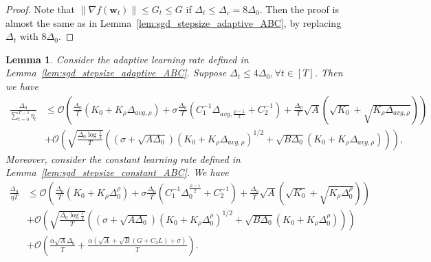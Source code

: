 \documentclass{article}
\newtheorem{lemma}{Lemma}
\newcommand{\Norm}[1]{\left\|#1\right\|}
\newcommand{\Kr}{K_{\rho}}
\newcommand{\paren}[1]{\left( #1 \right)}
\newcommand{\bw}{\mathbf{w}}
\begin{document}
\begin{proof}
    Note that $\Norm{\nabla f(\bw_t)}\leq G_t\leq G$ if $\Delta_t\leq\Delta_c=8\Delta_0$. Then the proof is almost the same as in Lemma~\ref{lem:sgd_stepsize_adaptive_ABC}, by replacing $\Delta_t$ with $8\Delta_0$.
\end{proof}

\begin{lemma}\label{lem:sgd_stepsize_complexity_ABC}
    Consider the adaptive learning rate defined in Lemma~\ref{lem:sgd_stepsize_adaptive_ABC}. 
    Suppose $\Delta_t\leq 4\Delta_0,\forall t\in[T]$.
    Then  we have 
    \begin{align*}
        \frac{\Delta_0}{\sum_{t=0}^{T-1}\eta_t}&\leq
        \mathcal{O}\paren{\frac{\Delta_0}{T}\paren{K_0+\Kr\Delta_{avg,\rho}}+\sigma\frac{\Delta_0}{T}\paren{C_1^{-1}\Delta_{avg,\frac{\rho-1}{2}}+C_2^{-1}}
        +\frac{\Delta_0}{T}\sqrt{A}\paren{\sqrt{K_0}+\sqrt{\Kr\Delta_{avg,\rho}}}}\\
        &+\mathcal{O}\paren{\sqrt{\frac{\Delta_0\log\frac{1}{\delta}}{T}}\paren{ \paren{\sigma+\sqrt{A\Delta_0}}\paren{K_0+\Kr\Delta_{avg,\rho}}^{1/2}+\sqrt{B\Delta_0}\paren{K_0+\Kr\Delta_{avg,\rho}}}},
    \end{align*}
    Moreover, consider the constant learning rate defined in Lemma~\ref{lem:sgd_stepsize_constant_ABC}. We have 
    \begin{align*}
        \frac{\Delta_0}{\eta T}&\leq
        \mathcal{O}\paren{\frac{\Delta_0}{T}\paren{K_0+\Kr\Delta_{0}^{\rho}}+\sigma\frac{\Delta_0}{T}\paren{C_1^{-1}\Delta_{0}^{\frac{\rho-1}{2}}+C_2^{-1}}
        +\frac{\Delta_0}{T}\sqrt{A}\paren{\sqrt{K_0}+\sqrt{\Kr\Delta_{0}^{\rho}}}}\\
        &+\mathcal{O}\paren{\sqrt{\frac{\Delta_0\log\frac{1}{\delta}}{T}}\paren{ \paren{\sigma+\sqrt{A\Delta_0}}\paren{K_0+\Kr\Delta_{0}^{\rho}}^{1/2}+\sqrt{B\Delta_0}\paren{K_0+\Kr\Delta_{0}^{\rho}}}}\\
        &+\mathcal{O}\paren{\frac{\alpha\sqrt{A}\Delta_0}{T}+\frac{\alpha\paren{\sqrt{A}+\sqrt{B}(G+C_2L)+\sigma}}{T}}.
    \end{align*}
\end{lemma}
\end{document}
